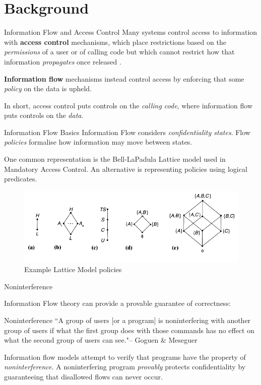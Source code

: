 \section{Background}

\begin{frame}{Information Flow and Access Control}
	Many systems control access to information with \textbf{access control} mechanisms, which place restrictions based on the \textit{permissions} of a user or of calling code but which cannot restrict how that information \textit{propagates} once released \cite{ifbackground:sabelfeld}.
	
	\textbf{Information flow} mechanisms instead control access by enforcing that some \textit{policy} on the data is upheld.
	
	In short, access control puts controls on the \textit{calling code}, where information flow puts controls on the \textit{data}.
\end{frame}

\begin{frame}{Information Flow Basics}
	Information Flow considers \textit{confidentiality states}. Flow \textit{policies} formalise how information may move between states.
	
	One common representation is the Bell-LaPadula Lattice model used in Mandatory Access Control. An alternative is representing policies using logical predicates.
	
	\begin{figure}
		\includegraphics[scale=0.45]{content/images/lattice_examples.png}
		\caption{Example Lattice Model policies \cite{ifbackground:sandhu}}
	\end{figure}
	
\end{frame}

\begin{frame}{Noninterference}
	
	Information Flow theory can provide a provable guarantee of correctness:
	\begin{block}{Noninterference}
		``A group of users [or a program] is noninterfering with another group of users if what the first group does with those commands has no effect on what the second group of users can see."\newline \tiny{-- Goguen \& Meseguer} \cite{ifbackground:goguen}
	\end{block}
	
	Information flow models attempt to verify that programs have the property of \textit{noninterference}. A noninterfering program \textit{provably} protects confidentiality by guaranteeing that disallowed flows can never occur.
\end{frame}

